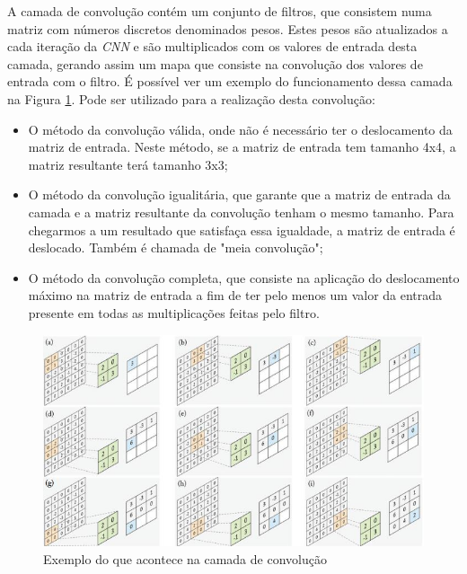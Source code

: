 \documentclass[
	12pt,				%
	openright,			%
	oneside,
	a4paper,			%
	english,			%
	french,				%
	spanish,			%
	brazil				%
	]{abntex2}
\begin{document}
    A camada de convolução contém um conjunto de filtros, que consistem numa matriz com números discretos denominados pesos. Estes pesos são atualizados a cada iteração da \textit{CNN} e são multiplicados com os valores de entrada desta camada, gerando assim um mapa que consiste na convolução dos valores de entrada com o filtro. É possível ver um exemplo do funcionamento dessa camada na Figura \ref{fig_cnn_conv}. Pode ser utilizado para a realização desta convolução:
    \begin{itemize}
        \item 
        O método da convolução válida, onde não é necessário ter o deslocamento da matriz de entrada. Neste método, se a matriz de entrada tem tamanho 4x4, a matriz resultante terá tamanho 3x3;
        
        \item
        O método da convolução igualitária, que garante que a matriz de entrada da camada e a matriz resultante da convolução tenham o mesmo tamanho. Para chegarmos a um resultado que satisfaça essa igualdade, a matriz de entrada é deslocado. Também é chamada de "meia convolução";
        
        \item
        O método da convolução completa, que consiste na aplicação do deslocamento máximo na matriz de entrada a fim de ter pelo menos um valor da entrada presente em todas as multiplicações feitas pelo filtro.
    \end{itemize} 
    
    \newpage
    
    \begin{figure}[ht]
        \caption{\label{fig_cnn_conv}Exemplo do que acontece na camada de convolução}
        \includegraphics[width=\textwidth]{CNN-ConvLayer.JPG}
    \end{figure}
    
\end{document}

